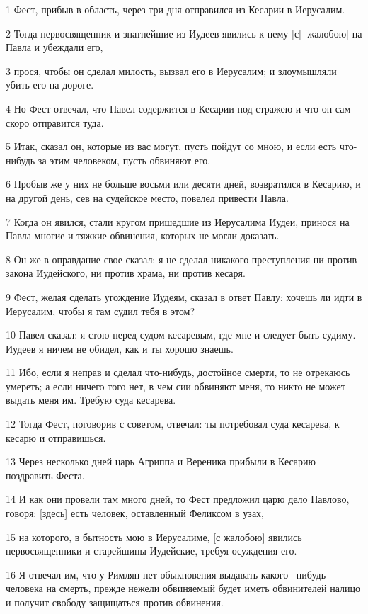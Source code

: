 \par 1 Фест, прибыв в область, через три дня отправился из Кесарии в Иерусалим.
\par 2 Тогда первосвященник и знатнейшие из Иудеев явились к нему [с] [жалобою] на Павла и убеждали его,
\par 3 прося, чтобы он сделал милость, вызвал его в Иерусалим; и злоумышляли убить его на дороге.
\par 4 Но Фест отвечал, что Павел содержится в Кесарии под стражею и что он сам скоро отправится туда.
\par 5 Итак, сказал он, которые из вас могут, пусть пойдут со мною, и если есть что-нибудь за этим человеком, пусть обвиняют его.
\par 6 Пробыв же у них не больше восьми или десяти дней, возвратился в Кесарию, и на другой день, сев на судейское место, повелел привести Павла.
\par 7 Когда он явился, стали кругом пришедшие из Иерусалима Иудеи, принося на Павла многие и тяжкие обвинения, которых не могли доказать.
\par 8 Он же в оправдание свое сказал: я не сделал никакого преступления ни против закона Иудейского, ни против храма, ни против кесаря.
\par 9 Фест, желая сделать угождение Иудеям, сказал в ответ Павлу: хочешь ли идти в Иерусалим, чтобы я там судил тебя в этом?
\par 10 Павел сказал: я стою перед судом кесаревым, где мне и следует быть судиму. Иудеев я ничем не обидел, как и ты хорошо знаешь.
\par 11 Ибо, если я неправ и сделал что-нибудь, достойное смерти, то не отрекаюсь умереть; а если ничего того нет, в чем сии обвиняют меня, то никто не может выдать меня им. Требую суда кесарева.
\par 12 Тогда Фест, поговорив с советом, отвечал: ты потребовал суда кесарева, к кесарю и отправишься.
\par 13 Через несколько дней царь Агриппа и Вереника прибыли в Кесарию поздравить Феста.
\par 14 И как они провели там много дней, то Фест предложил царю дело Павлово, говоря: [здесь] есть человек, оставленный Феликсом в узах,
\par 15 на которого, в бытность мою в Иерусалиме, [с жалобою] явились первосвященники и старейшины Иудейские, требуя осуждения его.
\par 16 Я отвечал им, что у Римлян нет обыкновения выдавать какого-- нибудь человека на смерть, прежде нежели обвиняемый будет иметь обвинителей налицо и получит свободу защищаться против обвинения.
